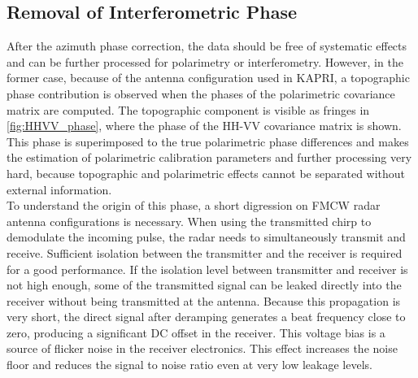 \subsection{Removal of Interferometric Phase}
After the azimuth phase correction, the data should be free of systematic effects and can be further processed for polarimetry or interferometry. However, in the former case, because of the antenna configuration used in KAPRI, a topographic phase contribution is observed when the phases of the polarimetric covariance matrix are computed. The topographic component is visible as fringes in \autoref{fig:HHVV_phase}, where the phase of the HH-VV covariance matrix is shown. This phase is superimposed to the true polarimetric phase differences and makes the estimation of polarimetric calibration parameters and further processing very hard, because topographic and polarimetric effects cannot be separated without external information.\\
To understand the origin of this phase, a short digression on FMCW radar antenna configurations is necessary.
When using the transmitted chirp to demodulate the incoming pulse, the radar needs to simultaneously transmit and receive. Sufficient isolation between the transmitter and the receiver is required for a good performance. If the isolation level between transmitter and receiver is not high enough, some of the transmitted signal can be leaked directly into the receiver without being transmitted at the antenna. Because this propagation is very short, the direct signal after deramping generates a beat frequency close to zero, producing a significant DC offset in the receiver. This voltage bias is a source of flicker noise in the receiver electronics. This effect increases the noise floor and reduces the signal to noise ratio\cite{Li2008} even at very low leakage levels.
